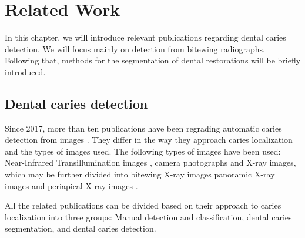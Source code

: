 \chapter{Related Work}
In this chapter, we will introduce relevant publications regarding dental caries detection. We will focus mainly on detection from bitewing radiographs. Following that, methods for the segmentation of dental restorations will be briefly introduced.

\section{Dental caries detection}
Since 2017, more than ten publications have been regrading automatic caries detection from images \cite{PradosPrivado2020}. They differ in the way they approach caries localization and the types of images used. The following types of images have been used: Near-Infrared Transillumination images \cite{Casalegno2019,Schwendicke2020}, camera photographs \cite{Moutselos2019} and X-ray images, which may be further divided into bitewing X-ray images \cite{Moran2021, Cantu2020, Bayrakdar2021, Mao2021, Srivastava2017} panoramic X-ray images \cite{Lian2021} and periapical X-ray images \cite{Lee2018}.

All the related publications can be divided based on their approach to caries localization into three groups: Manual detection and classification, dental caries segmentation, and dental caries detection.

